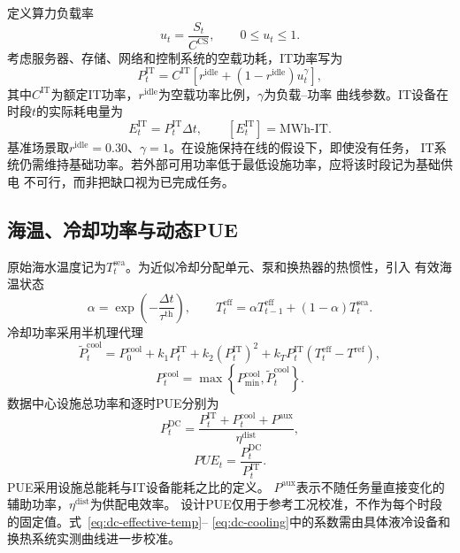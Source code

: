 定义算力负载率
\begin{equation}
u_t=\frac{S_t}{C^{\mathrm{CS}}},
\qquad 0\le u_t\le1.
\label{eq:dc-utilization}
\end{equation}
考虑服务器、存储、网络和控制系统的空载功耗，IT功率写为
\begin{equation}
P_t^{\mathrm{IT}}
=C^{\mathrm{IT}}
\left[r^{\mathrm{idle}}+
\left(1-r^{\mathrm{idle}}\right)u_t^{\gamma}\right],
\label{eq:dc-it-power}
\end{equation}
其中$C^{\mathrm{IT}}$为额定IT功率，$r^{\mathrm{idle}}$为空载功率比例，$\gamma$为负载--功率
曲线参数。IT设备在时段$t$的实际耗电量为
\begin{equation}
E_t^{\mathrm{IT}}=P_t^{\mathrm{IT}}\Delta t,
\qquad [E_t^{\mathrm{IT}}]=\mathrm{MWh\text{-}IT}.
\label{eq:dc-it-energy}
\end{equation}
基准场景取$r^{\mathrm{idle}}=0.30$、$\gamma=1$。在设施保持在线的假设下，即使没有任务，
IT系统仍需维持基础功率。若外部可用功率低于最低设施功率，应将该时段记为基础供电
不可行，而非把缺口视为已完成任务。

\subsection{海温、冷却功率与动态PUE}

原始海水温度记为$T_t^{\mathrm{sea}}$。为近似冷却分配单元、泵和换热器的热惯性，引入
有效海温状态
\begin{equation}
\alpha=\exp\left(-\frac{\Delta t}{\tau^{\mathrm{th}}}\right),
\qquad
T_t^{\mathrm{eff}}
=\alpha T_{t-1}^{\mathrm{eff}}+
(1-\alpha)T_t^{\mathrm{sea}}.
\label{eq:dc-effective-temp}
\end{equation}
冷却功率采用半机理代理
\begin{equation}
\widetilde P_t^{\mathrm{cool}}
=P_0^{\mathrm{cool}}+k_1P_t^{\mathrm{IT}}
+k_2\left(P_t^{\mathrm{IT}}\right)^2
+k_TP_t^{\mathrm{IT}}
\left(T_t^{\mathrm{eff}}-T^{\mathrm{ref}}\right),
\label{eq:dc-cooling-raw}
\end{equation}
\begin{equation}
P_t^{\mathrm{cool}}
=\max\left\{P_{\min}^{\mathrm{cool}},
\widetilde P_t^{\mathrm{cool}}\right\}.
\label{eq:dc-cooling}
\end{equation}
数据中心设施总功率和逐时PUE分别为
\begin{equation}
P_t^{\mathrm{DC}}
=\frac{P_t^{\mathrm{IT}}+P_t^{\mathrm{cool}}+P^{\mathrm{aux}}}
{\eta^{\mathrm{dist}}},
\label{eq:dc-total-power}
\end{equation}
\begin{equation}
PUE_t=\frac{P_t^{\mathrm{DC}}}{P_t^{\mathrm{IT}}}.
\label{eq:dc-pue}
\end{equation}
PUE采用设施总能耗与IT设备能耗之比的定义\cite{green-grid-pue,doe-pue}。
$P^{\mathrm{aux}}$表示不随任务量直接变化的辅助功率，$\eta^{\mathrm{dist}}$为供配电效率。
设计PUE仅用于参考工况校准，不作为每个时段的固定值。式~\eqref{eq:dc-effective-temp}--
\eqref{eq:dc-cooling}中的系数需由具体液冷设备和换热系统实测曲线进一步校准。

